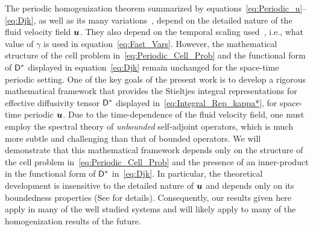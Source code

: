 \documentclass[amsa]{ipart}
\begin{document}
The periodic homogenization theorem summarized by
equations~\eqref{eq:Periodic_u}--\eqref{eq:Djk}, as well as its many
variations~\cite{Bensoussan:Book:1978,Papanicolaou:1981:36:8,Bhattacharya:1985:AnnProb:13:2:385,Bhattacharya:1989:ASD,McLaughlin:SIAM_JAM:780,Avellaneda:CMP-339,Pavliotis:PHD_Thesis,Pavliotis:IMAJAM:951,Pavliotis:CMS:2007:507,McLaughlin:Forest:PF:1999:880,Majda:Kramer:1999:book}, 
depend on the detailed nature of the fluid velocity field
$\boldsymbol{u}$. They also depend on the temporal scaling
used~\cite{Bhattacharya:1989:ASD,Pavliotis:PHD_Thesis,Majda:Kramer:1999:book},
i.e., what value of $\gamma$ is used in
equation~\eqref{eq:Fast_Vars}. However, the mathematical structure of
the cell problem in~\eqref{eq:Periodic_Cell_Prob} and the functional
form of $\mathsf{D}^*$ displayed in equation~\eqref{eq:Djk} remain
unchanged for the space-time periodic setting. One of the key goals of
the present work is to develop a rigorous mathematical framework that
provides the Stieltjes integral representations for effective diffusivity
tensor $\mathsf{D}^*$ displayed in~\eqref{eq:Integral_Rep_kappa*}, for
space-time periodic $\boldsymbol{u}$. Due to the time-dependence of the fluid
velocity field, one must employ the spectral theory of
\emph{unbounded} self-adjoint operators, which is much more
subtle and challenging than that of bounded operators. We will
demonstrate that this mathematical framework depends only on the
structure of the cell problem in~\eqref{eq:Periodic_Cell_Prob} and the
presence of an inner-product in the functional form of $\mathsf{D}^*$
in~\eqref{eq:Djk}. In particular, the theoretical development is 
insensitive to the detailed nature of $\boldsymbol{u}$ and depends only
on its boundedness properties (See  for
details). Consequently, our results given here apply in many of the
well studied systems and will likely apply to many of the
homogenization results of the future.          
\end{document}
